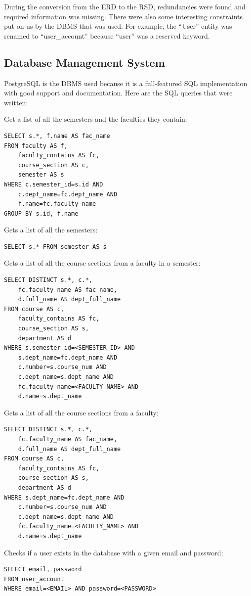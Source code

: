 \documentclass[twoside=false,a4paper,11pt]{article}
\theoremstyle{mytheor}
\begin{document}
During the conversion from the ERD to the RSD, redundancies were found and required information was missing. There were also some interesting constraints put on us by the DBMS that was used. For example, the ``User'' entity was renamed to ``user\_account'' because ``user'' was a reserved keyword.

\subsection*{Database Management System}

PostgreSQL is the DBMS used because it is a full-featured SQL implementation with good support and documentation. Here are the SQL queries that were written:

Get a list of all the semesters and the faculties they contain:
\begin{lstlisting}
SELECT s.*, f.name AS fac_name
FROM faculty AS f,
	faculty_contains AS fc,
	course_section AS c,
	semester AS s
WHERE c.semester_id=s.id AND
	c.dept_name=fc.dept_name AND
	f.name=fc.faculty_name
GROUP BY s.id, f.name
\end{lstlisting}

Gets a list of all the semesters:
\begin{lstlisting}
SELECT s.* FROM semester AS s
\end{lstlisting}

Gets a list of all the course sections from a faculty in a semester:
\begin{lstlisting}
SELECT DISTINCT s.*, c.*,
	fc.faculty_name AS fac_name,
	d.full_name AS dept_full_name
FROM course AS c,
	faculty_contains AS fc,
	course_section AS s,
	department AS d
WHERE s.semester_id=<SEMESTER_ID> AND
	s.dept_name=fc.dept_name AND
	c.number=s.course_num AND
	c.dept_name=s.dept_name AND
	fc.faculty_name=<FACULTY_NAME> AND
	d.name=s.dept_name
\end{lstlisting}

Gets a list of all the course sections from a faculty:
\begin{lstlisting}
SELECT DISTINCT s.*, c.*,
	fc.faculty_name AS fac_name,
	d.full_name AS dept_full_name
FROM course AS c,
	faculty_contains AS fc,
	course_section AS s,
	department AS d
WHERE s.dept_name=fc.dept_name AND
	c.number=s.course_num AND
	c.dept_name=s.dept_name AND
	fc.faculty_name=<FACULTY_NAME> AND
	d.name=s.dept_name
\end{lstlisting}

Checks if a user exists in the database with a given email and password:
\begin{lstlisting}
SELECT email, password
FROM user_account
WHERE email=<EMAIL> AND password=<PASSWORD>
\end{lstlisting}
\end{document}
